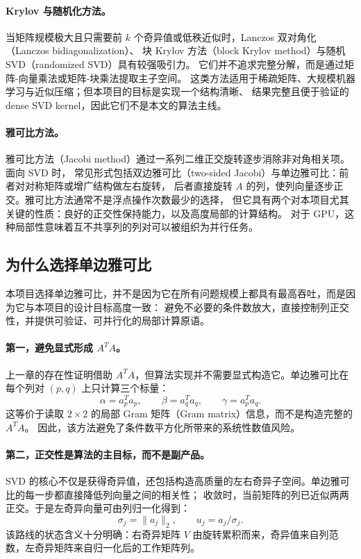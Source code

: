 \paragraph{Krylov 与随机化方法。}
当矩阵规模极大且只需要前 $k$ 个奇异值或低秩近似时，Lanczos 双对角化（Lanczos bidiagonalization）、
块 Krylov 方法（block Krylov method）与随机 SVD（randomized SVD）具有较强吸引力。
它们并不追求完整分解，而是通过矩阵-向量乘法或矩阵-块乘法提取主子空间。
这类方法适用于稀疏矩阵、大规模机器学习与近似压缩；但本项目的目标是实现一个结构清晰、
结果完整且便于验证的 dense SVD kernel，因此它们不是本文的算法主线。

\paragraph{雅可比方法。}
雅可比方法（Jacobi method）通过一系列二维正交旋转逐步消除非对角相关项。面向 SVD 时，
常见形式包括双边雅可比（two-sided Jacobi）与单边雅可比：前者对对称矩阵或增广结构做左右旋转，
后者直接旋转 $A$ 的列，使列向量逐步正交。雅可比方法通常不是浮点操作次数最少的选择，
但它具有两个对本项目尤其关键的性质：良好的正交性保持能力，以及高度局部的计算结构。
对于 GPU，这种局部性意味着互不共享列的列对可以被组织为并行任务。

\subsection{为什么选择单边雅可比}

本项目选择单边雅可比，并不是因为它在所有问题规模上都具有最高吞吐，而是因为它与本项目的设计目标高度一致：
避免不必要的条件数放大，直接控制列正交性，并提供可验证、可并行化的局部计算原语。

\paragraph{第一，避免显式形成 $A^TA$。}
上一章的存在性证明借助 $A^TA$，但算法实现并不需要显式构造它。单边雅可比在每个列对
$(p,q)$ 上只计算三个标量：
\[
    \alpha=a_p^Ta_p,\qquad
    \beta =a_q^Ta_q,\qquad
    \gamma=a_p^Ta_q.
\]
这等价于读取 $2\times 2$ 的局部 Gram 矩阵（Gram matrix）信息，而不是构造完整的 $A^TA$。
因此，该方法避免了条件数平方化所带来的系统性数值风险。

\paragraph{第二，正交性是算法的主目标，而不是副产品。}
SVD 的核心不仅是获得奇异值，还包括构造高质量的左右奇异子空间。单边雅可比的每一步都直接降低列向量之间的相关性；
收敛时，当前矩阵的列已近似两两正交。于是左奇异向量可由列归一化得到：
\[
    \sigma_j=\|a_j\|_2,\qquad u_j=a_j/\sigma_j.
\]
该路线的状态含义十分明确：右奇异矩阵 $V$ 由旋转累积而来，奇异值来自列范数，左奇异矩阵来自归一化后的工作矩阵列。

